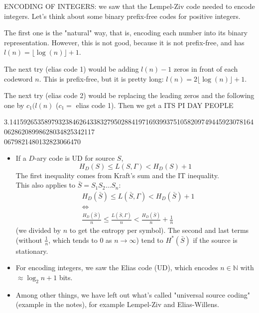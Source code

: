 \documentclass{report}
\begin{document}
ENCODING OF INTEGERS: we saw that the Lempel-Ziv code needed to encode integers. Let's think about some binary prefix-free codes for positive integers. \par
The first one is the "natural" way, that is, encoding each number into its binary representation. However, this is not good, because it is not prefix-free, and has $l(n) = \lfloor \log(n) \rfloor + 1$. \par
 The next try (elias code 1) would be adding $l(n) - 1$ zeros in front of each codeword $n$. This is prefix-free, but it is pretty long: $l(n) = 2 \lfloor \log(n) \rfloor + 1$. \par
 The next try (elias code 2) would be replacing the leading zeros and the following one by $c_1(l(n)$ ($c_1 =$ elias code 1). Then we get a ITS PI DAY PEOPLE \par
3.141592653589793238462643383279502884197169399375105820974944592307816406286208998628034825342117\\ 0679821480132823066470

\begin{summary}
\begin{itemize}
	\item If a $D$-ary code is UD for source $S$,
	\begin{equation*}
		H_D(S) \leq L(S, \Gamma) < H_D(S) + 1
	\end{equation*}
	The first inequality comes from Kraft's sum and the IT inequality. \\
	This also applies to $\bar S = S_1S_2\ldots S_n$:
	\begin{align*}
		&H_D(\bar S) \leq L(\bar S, \Gamma) < H_D(\bar S) + 1 \\
		&\iff \\
		&\frac{H_D(\bar S)}{n} \leq \frac{L(\bar S, \Gamma)}{n} < \frac{H_D(\bar S)}{n} + \frac1n
	\end{align*}
	(we divided by $n$ to get the entropy per symbol). The second and last terms (without $\frac1n$, which tends to 0 as $n \to \infty$) tend to $H^*(\bar S)$ if the source is stationary.
	\item For encoding integers, we saw the Elias code (UD), which encodes $n \in \mathbb N$ with $\approx \log_2 n + 1$ bits. 
	\item Among other things, we have left out what's called "universal source coding" (example in the notes), for example Lempel-Ziv and Elias-Willens.
\end{itemize}
\end{summary}
\end{document}
